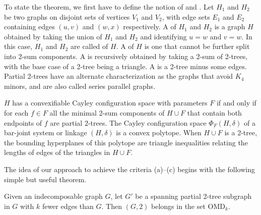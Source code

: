 To state the theorem, we first have to define the notion of  and . Let $H_1$ and $H_2$ be two graphs on disjoint sets of vertices $V_1$ and $V_2$, with edge sets $E_1$ and $E_2$ containing edges $(u,v)$ and $(w,x)$ respectively.%
A  of $H_1$ and $H_2$ is a graph $H$ obtained by taking the union of $H_1$ and $H_2$ and identifying $u=w$ and $v=w$. In this case, $H_1$ and $H_2$ are called  of $H$. A  of $H$ is  one that cannot be further split into 2-sum components. A  is recursively obtained by taking a 2-sum of 2-trees, with the base case of a 2-tree being a triangle. A  is a 2-tree minus some edges. Partial 2-trees have an alternate characterization as the graphs that avoid $K_4$ minors, and are also called series parallel graphs.

\begin{theorem}\label{theorem:convexcayley}
    \cite{sitharam2010convex} $H$ has a convexifiable Cayley configuration space  with parameters $F$ if and only if for each $f\in F$  all the minimal 2-sum components of $H\cup F$ that contain both endpoints of $f$ are partial 2-trees. The Cayley configuration space $\Phi_F(H,\delta)$ of a bar-joint system or linkage $(H,\delta)$ is a convex polytope. When $H\cup F$ is a 2-tree, the bounding hyperplanes of this polytope are triangle inequalities relating the lengths of edges of the triangles in $H\cup F$.
\end{theorem}

The idea of our approach to achieve the criteria (a)--(c) begins with the following simple but useful theorem.

\begin{theorem}\label{theorem:omdk}
    Given an indecomposable graph $G$, let $G'$ be a spanning partial 2-tree subgraph in $G$ with $k$ fewer edges than $G$. Then $(G,2)$ belongs in the set OMD$_k$.
\end{theorem}


